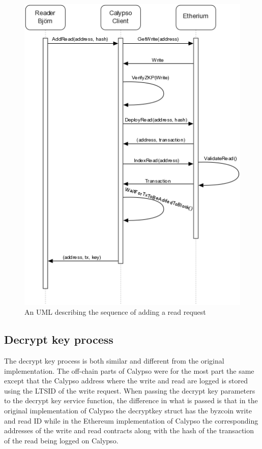 \documentclass[12pt]{article}
\begin{document}
\begin{figure}[H]
    \centering
    \includegraphics[width=1\textwidth]{NewReadSequence.png}
    \caption{An UML describing the sequence of adding a read request}
    \label{fig:ReadRequestSequenceDiagram}
\end{figure}

\subsection{Decrypt key process}
The decrypt key process is both similar and different from the original implementation. The off-chain parts of Calypso were for the most part the same except that the Calypso address where the write and read are logged is stored using the LTSID of the write request. When passing the decrypt key parameters to the decrypt key service function, the difference in what is passed is that in the original implementation of Calypso the decryptkey struct has the byzcoin write and read ID while in the Ethereum implementation of Calypso the corresponding addresses of the write and read contracts along with the hash of the transaction of the read being logged on Calypso.
\end{document}
